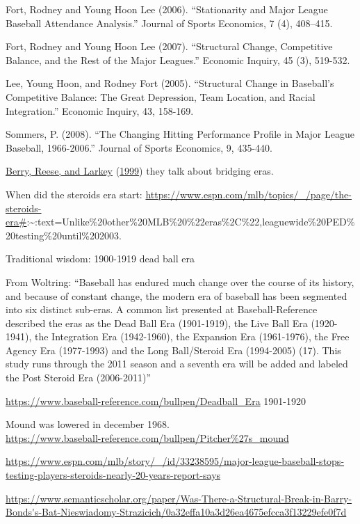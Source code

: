 \documentclass[
  12pt,
]{article}
\begin{document}
Fort, Rodney and Young Hoon Lee (2006). ``Stationarity and Major League
Baseball Attendance Analysis.'' Journal of Sports Economics, 7 (4),
408--415.

Fort, Rodney and Young Hoon Lee (2007). ``Structural Change, Competitive
Balance, and the Rest of the Major Leagues.'' Economic Inquiry, 45 (3),
519-532.

Lee, Young Hoon, and Rodney Fort (2005). ``Structural Change in
Baseball's Competitive Balance: The Great Depression, Team Location, and
Racial Integration.'' Economic Inquiry, 43, 158-169.

Sommers, P. (2008). ``The Changing Hitting Performance Profile in Major
League Baseball, 1966-2006.'' Journal of Sports Economics, 9, 435-440.

\protect\hyperlink{ref-Berry1999bridging}{Berry, Reese, and Larkey}
(\protect\hyperlink{ref-Berry1999bridging}{1999}) they talk about
bridging eras.

When did the steroids era start:
\url{https://www.espn.com/mlb/topics/_/page/the-steroids-era\#}:\textasciitilde:text=Unlike\%20other\%20MLB\%20\%22eras\%2C\%22,leaguewide\%20PED\%20testing\%20until\%202003.

Traditional wisdom: 1900-1919 dead ball era

From Woltring: ``Baseball has endured much change over the course of its
history, and because of constant change, the modern era of baseball has
been segmented into six distinct sub-eras. A common list presented at
Baseball-Reference described the eras as the Dead Ball Era (1901-1919),
the Live Ball Era (1920-1941), the Integration Era (1942-1960), the
Expansion Era (1961-1976), the Free Agency Era (1977-1993) and the Long
Ball/Steroid Era (1994-2005) (17). This study runs through the 2011
season and a seventh era will be added and labeled the Post Steroid Era
(2006-2011)''

\url{https://www.baseball-reference.com/bullpen/Deadball_Era} 1901-1920

Mound was lowered in december 1968.\\
\url{https://www.baseball-reference.com/bullpen/Pitcher\%27s_mound}

\url{https://www.espn.com/mlb/story/_/id/33238595/major-league-baseball-stops-testing-players-steroids-nearly-20-years-report-says}

\url{https://www.semanticscholar.org/paper/Was-There-a-Structural-Break-in-Barry-Bonds's-Bat-Nieswiadomy-Strazicich/0a32effa10a3d26ea4675efcca3f13229efe0f7d}
\end{document}
